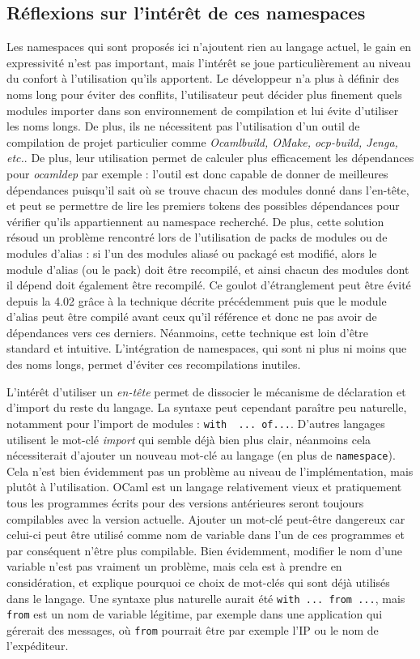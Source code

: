 \documentclass[11pt,a4paper]{report}
\begin{document}
\subsection{Réflexions sur l'intérêt de ces namespaces}

Les namespaces qui sont proposés ici n'ajoutent rien au langage actuel, le gain
en expressivité n'est pas important, mais l'intérêt se joue particulièrement au
niveau du confort à l'utilisation qu'ils apportent. Le développeur n'a plus à
définir des noms long pour éviter des conflits, l'utilisateur peut décider plus
finement quels modules importer dans son environnement de compilation et lui
évite d'utiliser les noms longs. De plus, ils ne nécessitent pas l'utilisation
d'un outil de compilation de projet particulier comme \emph{Ocamlbuild, OMake,
  ocp-build, Jenga, etc.}. De plus, leur utilisation permet de calculer plus
efficacement les dépendances pour \emph{ocamldep} par exemple : l'outil est donc
capable de donner de meilleures dépendances puisqu'il sait où se trouve chacun
des modules donné dans l'en-tête, et peut se permettre de lire les premiers
tokens des possibles dépendances pour vérifier qu'ils appartiennent au namespace
recherché. De plus, cette solution résoud un problème rencontré lors de
l'utilisation de packs de modules ou de modules d'alias : si l'un des modules
aliasé ou packagé est modifié, alors le module d'alias (ou le pack) doit être
recompilé, et ainsi chacun des modules dont il dépend doit également être
recompilé. Ce goulot d'étranglement peut être évité depuis la 4.02 grâce à la
technique décrite précédemment puis que le module d'alias peut être compilé
avant ceux qu'il référence et donc ne pas avoir de dépendances vers ces
derniers. Néanmoins, cette technique est loin d'être standard et
intuitive. L'intégration de namespaces, qui sont ni plus ni moins que des noms
longs, permet d'éviter ces recompilations inutiles.

L'intérêt d'utiliser un \emph{en-tête} permet de dissocier le mécanisme de
déclaration et d'import du reste du langage. La syntaxe peut cependant paraître
peu naturelle, notamment pour l'import de modules : 
\lstinline{with  ... of...}. 
D'autres langages utilisent le mot-clé \emph{import} qui semble
déjà bien plus clair, néanmoins cela nécessiterait d'ajouter un nouveau mot-clé
au langage (en plus de \texttt{namespace}). Cela n'est bien évidemment pas un
problème au niveau de l'implémentation, mais plutôt à l'utilisation. OCaml est
un langage relativement vieux et pratiquement tous les programmes écrits pour
des versions antérieures seront toujours compilables avec la version
actuelle. Ajouter un mot-clé peut-être dangereux car celui-ci peut être utilisé
comme nom de variable dans l'un de ces programmes et par conséquent n'être plus
compilable. Bien évidemment, modifier le nom d'une variable n'est pas vraiment
un problème, mais cela est à prendre en considération, et explique pourquoi ce
choix de mot-clés qui sont déjà utilisés dans le langage. Une syntaxe plus
naturelle aurait été \texttt{with ... from ...}, mais \texttt{from} est un nom
de variable légitime, par exemple dans une application qui gérerait des
messages, où \texttt{from} pourrait être par exemple l'IP ou le nom de
l'expéditeur.
\end{document}
